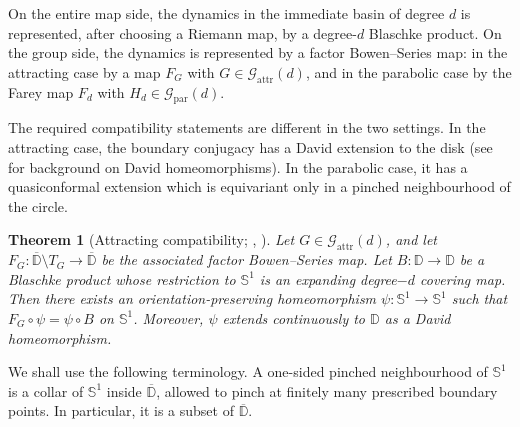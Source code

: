 \documentclass[11pt,a4paper, oneside]{amsart}
\newtheorem{thm}{Theorem}[section]
\theoremstyle{definition}
\theoremstyle{remark}
\numberwithin{equation}{section}
\def\D{{\mathbb{D}}}
\newcommand{\parab}{{\text{par}}}
\newcommand{\attr}{{\text{attr}}}
\newcommand{\Circle}{{{\mathbb S}^1}}
\begin{document}
On the entire map side, the dynamics in the immediate basin of degree $d$ is
represented, after choosing a Riemann map, by a degree-$d$ Blaschke product.  On
the group side, the dynamics is represented by a factor Bowen--Series map: in
the attracting case by a map $F_G$ with $G\in\mathscr G_{\attr}(d)$, and in the
parabolic case by the Farey map $F_d$ with $H_d\in\mathscr G_{\parab}(d)$.

The required compatibility statements are different in the two settings.  In the
attracting case, the boundary conjugacy has a David extension to the disk (see \cite{David} for background on David homeomorphisms).  In
the parabolic case, it has a quasiconformal extension which is equivariant only
in a pinched neighbourhood of the circle.

\begin{thm}[Attracting compatibility;
	{\cite[Theorem~4.9]{LMMN}, \cite[Lemma~3.4]{MM}}]
	\label{Thm:AttractingCompatibility}
	Let $G\in\mathscr G_{\attr}(d)$, and let
	$F_G:\overline{\D}\setminus T_G\to\overline{\D}$ be the associated factor
	Bowen--Series map.  Let $B:\D\to\D$ be a Blaschke product whose
	restriction to $\Circle$ is an expanding degree$-d$ covering map.  Then there
	exists an orientation-preserving homeomorphism $\psi:\Circle\to\Circle$ such
	that $F_G\circ\psi=\psi\circ B$ on $\Circle$.  Moreover, $\psi$ extends continuously to $\D$ as a David homeomorphism.
\end{thm}

We shall use the following terminology. A one-sided pinched neighbourhood of
$\Circle$ is a collar of $\Circle$ inside $\overline\D$, allowed to pinch at
finitely many prescribed boundary points. In particular, it is a subset of
$\overline\D$.
\end{document}
